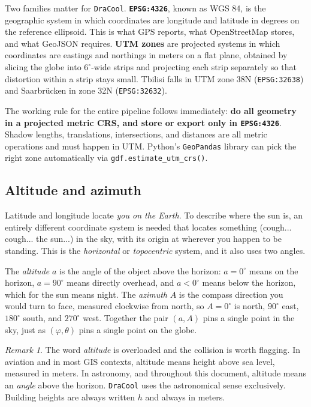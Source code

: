 \documentclass[11pt,a4paper]{article}
\theoremstyle{plain}
\theoremstyle{definition}
\theoremstyle{remark}
\newtheorem{remark}{Remark}
\begin{document}
Two families matter for \texttt{DraCool}. \textbf{\texttt{EPSG:4326}}, known as WGS 84, is the geographic system in which coordinates are longitude and latitude in degrees on the reference ellipsoid. This is what GPS reports, what OpenStreetMap stores, and what GeoJSON requires. \textbf{UTM zones} are projected systems in which coordinates are eastings and northings in meters on a flat plane, obtained by slicing the globe into $6^\circ$-wide strips and projecting each strip separately so that distortion within a strip stays small. Tbilisi falls in UTM zone 38N (\texttt{EPSG:32638}) and Saarbr\"ucken in zone 32N (\texttt{EPSG:32632}).

The working rule for the entire pipeline follows immediately: \textbf{do all geometry in a projected metric CRS, and store or export only in \texttt{EPSG:4326}}. Shadow lengths, translations, intersections, and distances are all metric operations and must happen in UTM. Python's \texttt{GeoPandas} library can pick the right zone automatically via \texttt{gdf.estimate\_utm\_crs()}.

\subsection{Altitude and azimuth}

Latitude and longitude locate \emph{you on the Earth}. To describe where the sun is, an entirely different coordinate system is needed that locates something (cough... cough... the sun...) in the sky, with its origin at wherever you happen to be standing. This is the \emph{horizontal} or \emph{topocentric} system, and it also uses two angles.

The \emph{altitude} $a$ is the angle of the object above the horizon: $a = 0^\circ$ means on the horizon, $a = 90^\circ$ means directly overhead, and $a < 0^\circ$ means below the horizon, which for the sun means night. The \emph{azimuth} $A$ is the compass direction you would turn to face, measured clockwise from north, so $A = 0^\circ$ is north, $90^\circ$ east, $180^\circ$ south, and $270^\circ$ west. Together the pair $(a, A)$ pins a single point in the sky, just as $(\varphi, \theta)$ pins a single point on the globe.

\begin{remark}
The word \emph{altitude} is overloaded and the collision is worth flagging. In aviation and in most GIS contexts, altitude means height above sea level, measured in meters. In astronomy, and throughout this document, altitude means an \emph{angle} above the horizon. \texttt{DraCool} uses the astronomical sense exclusively. Building heights are always written $h$ and always in meters.
\end{remark}
\end{document}
